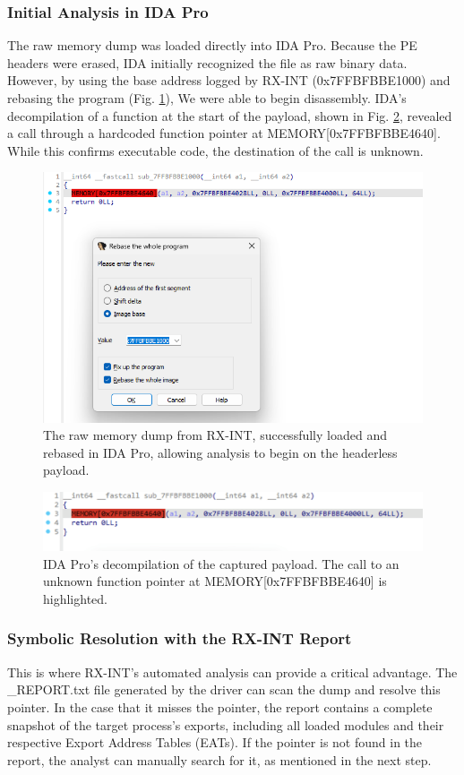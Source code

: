 \documentclass[journal]{IEEEtran}
\begin{document}
\subsubsection{Initial Analysis in IDA Pro}
The raw memory dump was loaded directly into IDA Pro. Because the PE headers were erased, IDA initially recognized the file as raw binary data. However, by using the base address logged by RX-INT (0x7FFBFBBE1000) and rebasing the program (Fig. \ref{fig_ida_rebase}), We were able to begin disassembly. IDA's decompilation of a function at the start of the payload, shown in Fig. \ref{fig_ida_pseudo}, revealed a call through a hardcoded function pointer at MEMORY[0x7FFBFBBE4640]. While this confirms executable code, the destination of the call is unknown.
\begin{figure}[!t]
\centering
\includegraphics[width=\columnwidth]{figures/ida_rebase.png}
\caption{The raw memory dump from RX-INT, successfully loaded and rebased in IDA Pro, allowing analysis to begin on the headerless payload.}
\label{fig_ida_rebase}
\end{figure}
\begin{figure}[!t]
\centering
\includegraphics[width=\columnwidth]{figures/ida_pseudocode.png}
\caption{IDA Pro's decompilation of the captured payload. The call to an unknown function pointer at MEMORY[0x7FFBFBBE4640] is highlighted.}
\label{fig_ida_pseudo}
\end{figure}
\subsubsection{Symbolic Resolution with the RX-INT Report}
This is where RX-INT's automated analysis can provide a critical advantage. The \_REPORT.txt file generated by the driver can scan the dump and resolve this pointer. In the case that it misses the pointer, the report contains a complete snapshot of the target process's exports, including all loaded modules and their respective Export Address Tables (EATs). If the pointer is not found in the report, the analyst can manually search for it, as mentioned in the next step.
\end{document}
